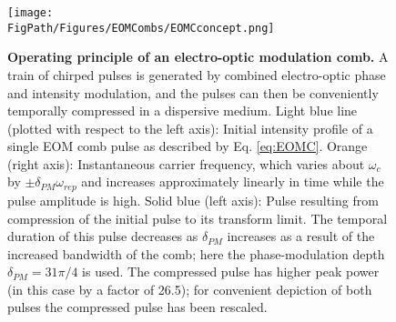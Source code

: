 \begin{figure}[htpb]
	\begin{center}
		\texttt{[image: \\FigPath/Figures/EOMCombs/EOMCconcept.png]}
	\end{center}
	\caption[Operating principle of an electro-optic modulation comb]{\textbf{Operating principle of an electro-optic modulation comb.} A train of chirped pulses is generated by combined electro-optic phase and intensity modulation,  and the pulses can then be conveniently temporally compressed in a dispersive medium. Light blue line (plotted with respect to the left axis): Initial intensity profile of a single EOM comb pulse as described by Eq. \ref{eq:EOMC}. Orange (right axis): Instantaneous carrier frequency, which varies about $\omega_c$ by $\pm\delta_{PM}\omega_{rep}$ and increases approximately linearly in time while the pulse amplitude is high. Solid blue (left axis): Pulse resulting from compression of the initial pulse to its transform limit. The temporal duration of this pulse decreases as $\delta_{PM}$ increases as a result of the increased bandwidth of the comb; here the phase-modulation depth $\delta_{PM}=31\pi/4$ is used. The compressed pulse has higher peak power (in this case by a factor of 26.5); for convenient depiction of both pulses the compressed pulse has been rescaled.}
	\label{fig:EOMCconcept}
\end{figure} 

